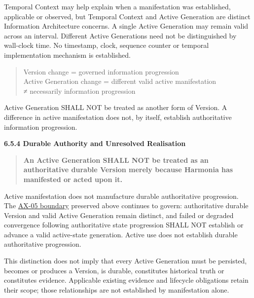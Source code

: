 Temporal Context may help explain when a manifestation was established,
applicable or observed, but Temporal Context and Active Generation are distinct
Information Architecture concerns. A single Active Generation may remain valid
across an interval. Different Active Generations need not be distinguished by
wall-clock time. No timestamp, clock, sequence counter or temporal implementation
mechanism is established.



\begin{quote}\small\ttfamily
Version change           = governed information progression\\
Active Generation change = different valid active manifestation\\
                         ≠ necessarily information progression\\

\end{quote}


Active Generation SHALL NOT be treated as another form of Version. A difference
in active manifestation does not, by itself, establish authoritative information
progression.



\par\medskip\textbf{6.5.4 Durable Authority and Unresolved Realisation}\par


\begin{quote}


\textbf{An Active Generation SHALL NOT be treated as an authoritative durable Version merely because Harmonia has manifested or acted upon it.}



\end{quote}


Active manifestation does not manufacture durable authoritative progression.
The \hyperref[element:0412a2084f0145babc4f022c71fea65f]{AX-05 boundary} preserved above
continues to govern: authoritative durable Version and valid Active Generation
remain distinct, and failed or degraded convergence following authoritative state
progression SHALL NOT establish or advance a valid active-state generation.
Active use does not establish durable authoritative progression.



This distinction does not imply that every Active Generation must be persisted,
becomes or produces a Version, is durable, constitutes historical truth or
constitutes evidence. Applicable existing evidence and lifecycle obligations
retain their scope; those relationships are not established by manifestation
alone.



